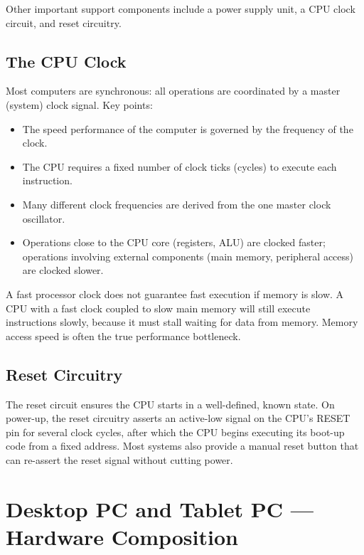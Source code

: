 \documentclass[11pt, a4paper, notitlepage]{report}
\theoremstyle{definition}
\theoremstyle{remark}
\theoremstyle{definition}
\begin{document}
Other important support components include a power supply unit, a CPU clock circuit, and reset circuitry.

\subsection{The CPU Clock}

Most computers are synchronous: all operations are coordinated by a master (system) clock signal. Key points:

\begin{itemize}
  \item The speed performance of the computer is governed by the frequency of the clock.
  \item The CPU requires a fixed number of clock ticks (cycles) to execute each instruction.
  \item Many different clock frequencies are derived from the one master clock oscillator.
  \item Operations close to the CPU core (registers, ALU) are clocked faster; operations involving external components (main memory, peripheral access) are clocked slower.
\end{itemize}

\begin{warning}[title={Clock Speed $\neq$ Performance}]
A fast processor clock does not guarantee fast execution if memory is slow. A CPU with a fast clock coupled to slow main memory will still execute instructions slowly, because it must stall waiting for data from memory. Memory access speed is often the true performance bottleneck.
\end{warning}

\subsection{Reset Circuitry}

The reset circuit ensures the CPU starts in a well-defined, known state. On power-up, the reset circuitry asserts an active-low signal on the CPU's RESET pin for several clock cycles, after which the CPU begins executing its boot-up code from a fixed address. Most systems also provide a manual reset button that can re-assert the reset signal without cutting power.

\section{Desktop PC and Tablet PC --- Hardware Composition}
\end{document}
